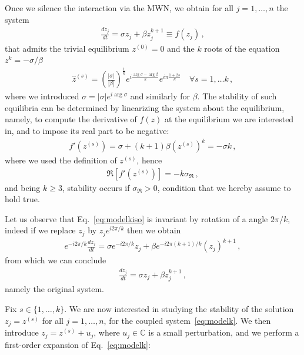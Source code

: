 \documentclass[aps,showpacs,preprintnumbers,amsmath,amssymb,twocolumn,superscriptaddress,floatfix,nofootinbib,10pt,pre]{revtex4-1}
\begin{document}
Once we silence the interaction via the MWN, we obtain for all $j=1,\dots,n$ the system
\begin{align}
\label{eq:modelkiso}
\frac{dz_j}{dt}=\sigma z_j+\beta z_j^{k+1}\equiv f(z_j)\, ,
\end{align}
that admits the trivial equilibrium $z^{(0)}=0$ and the $k$ roots of the equation $z^{k}=-\sigma /\beta$
\begin{align}
\label{eq:roots}
\hat{z}^{(s)} = \left(\frac{|\sigma|}{|\beta|}\right)^{\frac{1}{k}}e^{i\frac{\arg \sigma - \arg \beta}{k}}e^{i\pi \frac{1+2s}{k}}\quad \forall s=1,\dots k\, ,
\end{align}
where we introduced $\sigma=|\sigma|e^{i\arg \sigma}$ and similarly for $\beta$. The stability of such equilibria can be determined by linearizing the system about the equilibrium, namely, to compute the derivative of $f(z)$ at the equilibrium we are interested in, and to impose its real part to be negative:
\begin{align}
\label{eq:fprime}
f'(z^{(s)})=\sigma +(k+1)\beta (z^{(s)})^{k}=-\sigma k\, ,
\end{align}
where we used the definition of $z^{(s)}$, hence
\begin{align}
\label{eq:refprime}
\Re \left[f'(z^{(s)})\right]= -k\sigma_{\Re}\, ,
\end{align}
and being $k\geq 3$, stability occurs if $\sigma_{\Re}>0$, condition that we hereby assume to hold true.

Let us observe that Eq.~\eqref{eq:modelkiso} is invariant by rotation of a angle $2\pi/k$, indeed if we replace $z_j$ by $z_j e^{i 2\pi/k}$ then we obtain
\begin{align}
\label{eq:modelkisoinv}
e^{-i 2\pi/k}\frac{dz_j}{dt}=\sigma e^{-i 2\pi/k} z_j +\beta  e^{-i 2\pi (k+1)/k}(z_j)^{k+1}\, ,
\end{align}
from which we can conclude
\begin{align}
\label{eq:modelkisoinv2}
\frac{dz_j}{dt}=\sigma z_j +\beta z_j^{k+1}\, ,
\end{align}
namely the original system.

Fix $s\in\{1,\dots,k\}$. We are now interested in studying the stability of the solution $z_j=z^{(s)}$ for all $j=1,\dots,n$, for the coupled system~\eqref{eq:modelk}. We then introduce $z_j=z^{(s)}+u_j$, where $u_j\in\mathbb{C}$ is a small perturbation, and we perform a first-order expansion of Eq.~\eqref{eq:modelk}:
\end{document}

